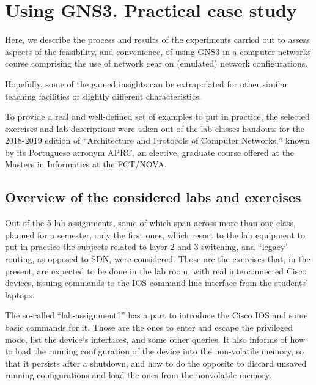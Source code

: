 \section{Using GNS3. Practical case study}
\label{sec:gns3practicalcasestudy}

Here, we describe the process and results of the experiments carried out to assess aspects of the feasibility, and convenience, of using GNS3 in a computer networks course comprising the use of network gear on (emulated) network configurations.

Hopefully, some of the gained insights can be extrapolated for other similar teaching facilities of slightly different characteristics.

To provide a real and well-defined set of examples to put in practice, the selected exercises and lab descriptions were taken out of the lab classes handouts for the 2018-2019 edition of ``Architecture and Protocols of Computer Networks,'' known by its Portuguese acronym APRC, an elective, graduate course offered at the Masters in Informatics at the FCT/NOVA.

\subsection{Overview of the considered labs and exercises}
\label{subsec:gns3consideredlabs}

Out of the 5 lab assignments, some of which span across more than one class, planned for a semester, only the first ones, which resort to the lab equipment to put in practice the subjects related to layer-2 and 3 switching, and ``legacy'' routing, as opposed to SDN, were considered. %
Those are the exercises that, in the present, are expected to be done in the lab room, with real interconnected Cisco devices, issuing commands to the IOS command-line interface from the students' laptops.

The so-called ``lab-assignment1'' has a part to introduce the Cisco IOS and some basic commands for it.
Those are the ones to enter and escape the privileged mode, list the device's interfaces, and some other queries.
It also informs of how to load the running configuration of the device into the non-volatile memory, so that it persists after a shutdown, and how to do the opposite to discard unsaved running configurations and load the ones from the nonvolatile memory.

